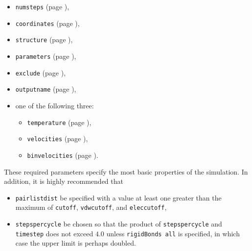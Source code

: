 \begin{itemize}

\item
\verb!numsteps! (page \pageref{param:numsteps}),

\item
\verb!coordinates! (page \pageref{param:coordinates}),

\item
\verb!structure! (page \pageref{param:structure}),

\item
\verb!parameters! (page \pageref{param:parameters}),

\item
\verb!exclude! (page \pageref{param:exclude}), 

\item
\verb!outputname! (page \pageref{param:outputname}), 

\item
one of the following three:
\begin{itemize}
\item
\verb!temperature! (page \pageref{param:temperature}),

\item
\verb!velocities! (page \pageref{param:velocities}),

\item
\verb!binvelocities! (page \pageref{param:binvelocities}).
\end{itemize}

\end{itemize}

\noindent These required parameters specify the most basic properties of
the simulation.  %
In addition, it is highly recommended that 
\begin{itemize}
\item
\verb!pairlistdist! be specified with a 
value at least one greater than the maximum of 
\verb!cutoff!, \verb!vdwcutoff!, and \verb!eleccutoff!, 
\item 
\verb!stepspercycle! be chosen so that the product of 
\verb!stepspercycle! and \verb!timestep! does not exceed 
$4.0$ unless \verb!rigidBonds all! is specified, 
in which case the upper limit is perhaps doubled.  
\end{itemize}

